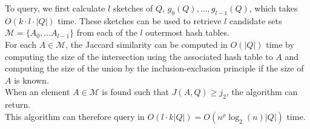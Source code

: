 To query, we first calculate $l$ sketches of $Q$, $g_0(Q), \dots, g_{l-1}(Q)$, which takes $O(k \cdot l \cdot |Q|)$ time. These sketches can be used to retrieve $l$ candidate sets $\mathcal{M} = \{ A_0, \dots A_{l-1}\}$ from each of the $l$ outermost hash tables. \\
For each $A\in \mathcal{M}$, the Jaccard similarity can be computed in $O(|Q|)$ time by computing the size of the intersection using the associated hash table to $A$ and computing the size of the union by the inclusion-exclusion principle if the size of $A$ is known.\\
When an element $A\in \mathcal{M}$ is found such that $J(A,Q) \geq j_2$, the algorithm can return.\\
This algorithm can therefore query in $O(l\cdot k |Q|) = O(n^\rho\log_2{(n)}|Q|)$ time.





